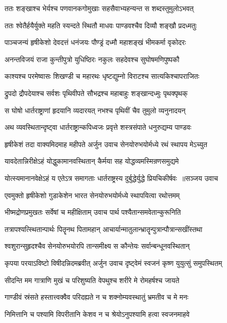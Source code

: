 \twolineshloka
{ततः शङ्खाश्च भेर्यश्च पणवानकगोमुखाः}
{सहसैवाभ्यहन्यन्त स शब्दस्तुमुलोऽभवत्}


\twolineshloka
{ततः श्वेतैर्हयैर्युक्ते महति स्यन्दते स्थितौ}
{माधवः पाण्डवश्चैव दिव्यौ शङ्खौ प्रदध्मतुः}


\twolineshloka
{पाञ्चजन्यं हृषीकेशो देवदत्तं धनंजयः}
{पौण्ड्रं दध्मौ महाशङ्खं भीमकर्मा वृकोदरः}


\twolineshloka
{अनन्तविजयं राजा कुन्तीपुत्रो युधिष्ठिरः}
{नकुलः सहदेवश्च सुघोषमणिपुष्पकौ}


\twolineshloka
{काश्यश्च परमेष्वासः शिखण्डी च महारथः}
{धृष्टद्युम्नो विराटश्च सात्यकिश्चापराजितः}


\twolineshloka
{द्रुपदो द्रौपदेयाश्च सर्वशः पृथिवीपते}
{सौभद्रश्च महाबाहुः शङ्खान्दध्मुः पृथक्पृथक्}


\twolineshloka
{स घोषो धार्तराष्ट्राणां हृदयानि व्यदारयत्}
{नभश्च पृथिवीं चैव तुमुलो व्यनुनादयन्}


\twolineshloka
{अथ व्यवस्थितान्दृष्ट्वा धार्तराष्ट्रान्कपिध्वजः}
{प्रवृत्ते शस्त्रसंपाते धनुरुद्यम्य पाण्डवः}


\threelineshloka
{हृषीकेशं तदा वाक्यमिदमाह महीपते}
{अर्जुन उवाच}
{सेनयोरुभयोर्मध्ये रथं स्थापय मेऽच्युत}


\twolineshloka
{यावदेतान्निरीक्षेऽहं योद्धुकामानवस्थितान्}
{कैर्मया सह योद्धव्यमस्मिन्रणसमुद्यमे}


\threelineshloka
{योत्स्यमानानवेक्षेऽहं य एतेऽत्र समागताः}
{धार्तराष्ट्रस्य दुर्बुद्धेर्युद्धे प्रियचिकीर्षवः ॥सञ्जय उवाच}
{}


\twolineshloka
{एवमुक्तो हृषीकेशो गुडाकेशेन भारत}
{सेनयोरुभयोर्मध्ये स्थापयित्वा रथोत्तमम्}


\twolineshloka
{भीष्मद्रोणप्रमुखतः सर्वेषां च महीक्षिताम्}
{उवाच पार्थ पश्यैतान्समवेतान्कुरूनिति}


\twolineshloka
{तत्रापश्यत्स्थितान्पार्थः पितॄनथ पितामहान्}
{आचार्यान्मातुलान्भ्रातॄन्पुत्रान्पौत्रान्सखींस्तथा}


\twolineshloka
{श्वशुरान्सुहृदश्चैव सेनयोरुभयोरपि}
{तान्समीक्ष्य स कौन्तेयः सर्वान्बन्धूनवस्थितान्}


\threelineshloka
{कृपया परयाऽविष्टो विषीदन्निदमब्रवीत्}
{अर्जुन उवाच}
{दृष्ट्वेमं स्वजनं कृष्ण युयुत्सुं समुपस्थितम्}


\twolineshloka
{सीदन्ति मम गात्राणि मुखं च परिशुष्यति}
{वेपथुश्च शरीरे मे रोमहर्षश्च जायते}


\twolineshloka
{गाण्डीवं स्रंसते हस्तात्त्वक्वैव परिदह्यते}
{न च शक्नोम्यवस्थातुं भ्रमतीव च मे मनः}


\twolineshloka
{निमित्तानि च पश्यामि विपरीतानि केशव}
{न च श्रेयोऽनुपश्यामि हत्वा स्वजनमाहवे}


